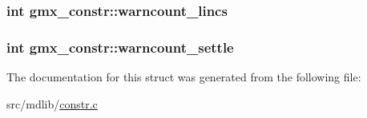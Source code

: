 \hypertarget{structgmx__constr_a43244d4dadd5d2cfc3093446b1138d13}{
\subsubsection[{warncount\-\_\-lincs}]{\setlength{\rightskip}{0pt plus 5cm}int {\bf gmx\-\_\-constr\-::warncount\-\_\-lincs}}}\label{structgmx__constr_a43244d4dadd5d2cfc3093446b1138d13}
\hypertarget{structgmx__constr_a4c605aa5057f79b7780f475d76f9baa6}{
\subsubsection[{warncount\-\_\-settle}]{\setlength{\rightskip}{0pt plus 5cm}int {\bf gmx\-\_\-constr\-::warncount\-\_\-settle}}}\label{structgmx__constr_a4c605aa5057f79b7780f475d76f9baa6}


\-The documentation for this struct was generated from the following file\-:\begin{DoxyCompactItemize}
\item 
src/mdlib/\hyperlink{constr_8c}{constr.\-c}\end{DoxyCompactItemize}
